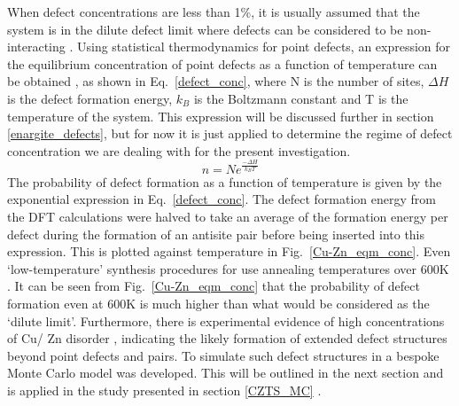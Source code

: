 \documentclass[11pt, twoside]{report}
\begin{document}
When defect concentrations are less than 1\%, it is usually assumed that the system is in the dilute defect limit where defects can be considered to be non-interacting \cite{Stoneham_defect_lim}. Using statistical thermodynamics for point defects, an expression for the equilibrium concentration of point defects as a function of temperature can be obtained \cite{thermodynamics}, as shown in Eq.~\ref{defect_conc}, where N is the number of sites, $\Delta H$ is the defect formation energy, $k_B$ is the Boltzmann constant and T is the temperature of the system. This expression will be discussed further in section \ref{enargite_defects}, but for now it is just applied to determine the regime of defect concentration we are dealing with for the present investigation.
\begin{equation} \label{defect_conc}
n = Ne^{\frac{-\Delta H}{k_BT}}
\end{equation}
The probability of defect formation as a function of temperature is given by the exponential expression in Eq.~\ref{defect_conc}. The defect formation energy from the DFT calculations were halved to take an average of the formation energy per defect during the formation of an antisite pair before being inserted into this expression. This is plotted against temperature in Fig.~\ref{Cu-Zn_eqm_conc}. 
Even `low-temperature' synthesis procedures for {\CZTS} use annealing temperatures over 600K \cite{low_T_CZTS}. It can be seen from Fig.~\ref{Cu-Zn_eqm_conc} that the probability of defect formation even at 600K is much higher than what would be considered as the `dilute limit'.
Furthermore, there is experimental evidence of high concentrations of Cu/ Zn disorder \cite{Scragg, pot_fluc_4, neutron, Schorr}, indicating the likely formation of extended defect structures beyond point defects and pairs. To simulate such defect structures in {\CZTS} a bespoke Monte Carlo model was developed. This will be outlined in the next section and is applied in the study presented in section \ref{CZTS_MC} \cite{eris_paper}.
\end{document}
